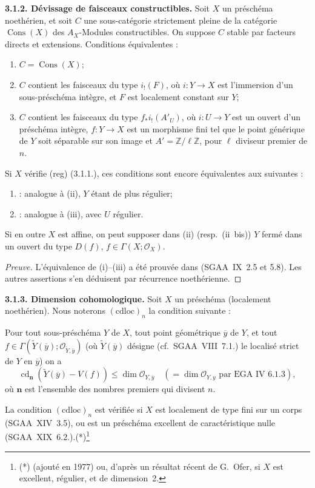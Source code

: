 \documentclass[11pt]{article}
\providecommand{\cO}{\mathcal{O}}
\providecommand{\wt}[1]{\widetilde{#1}}
\providecommand{\Cons}{\operatorname{Cons}}
\DeclareMathOperator{\cd}{cd}
\newcommand{\Z}{\mathbb{Z}}
\newcommand{\ol}[1]{\overline{#1}}
\providecommand{\Z}{\mathbb Z}
\begin{document}
\textbf{3.1.2. Dévissage de faisceaux constructibles.} Soit $X$ un préschéma noethérien, et soit $C$ une sous-catégorie strictement pleine de la catégorie $\Cons(X)$ des $A_X$-Modules constructibles. On suppose $C$ stable par facteurs directs et extensions. Conditions équivalentes :
\begin{enumerate}
\item[(i)] $C = \Cons(X)$;
\item[(ii)] $C$ contient les faisceaux du type $i_{!}(F)$, où $i : Y \to X$ est l'immersion d'un sous-préschéma intègre, et $F$ est localement constant sur $Y$;
\item[(iii)] $C$ contient les faisceaux du type $f_{*}i_{!}(A'_U)$, où $i : U \to Y$ est un ouvert d'un préschéma intègre, $f : Y \to X$ est un morphisme fini tel que le point générique de $Y$ soit séparable sur son image et $A' = \Z/\ell\Z$, pour $\ell$ diviseur premier de $n$.
\end{enumerate}
Si $X$ vérifie (reg) (3.1.1.), ces conditions sont encore équivalentes aux suivantes :
\begin{enumerate}
\item[(ii~bis)] : analogue à (ii), $Y$ étant de plus régulier;
\item[(iii~bis)] : analogue à (iii), avec $U$ régulier.
\end{enumerate}
Si en outre $X$ est affine, on peut supposer dans (ii) (resp.~(ii~bis)) $Y$ fermé dans un ouvert du type $D(f)$, $f \in \Gamma(X; \cO_X)$.

\begin{proof}[Preuve]
L'équivalence de (i)--(iii) a été prouvée dans (SGAA~IX~2.5 et 5.8). Les autres assertions s'en déduisent par récurrence noethérienne.
\end{proof}

\textbf{3.1.3. Dimension cohomologique.} Soit $X$ un préschéma (localement noethérien). Nous noterons $(\mathrm{cdloc})_n$ la condition suivante :

Pour tout sous-préschéma $Y$ de $X$, tout point géométrique $\ol{y}$ de $Y$, et tout $f \in \Gamma(\wt{Y}(\ol{y}); \cO_{\wt{Y},\ol{y}})$ (où $\wt{Y}(\ol{y})$ désigne (cf.~SGAA~VIII~7.1.) le localisé strict de $Y$ en $\ol{y}$) on a
\[
\cd_{\mathbf{n}}(\wt{Y}(\ol{y}) - V(f)) \leqslant \dim \cO_{Y,\ol{y}} \quad (= \dim \cO_{Y,y} \text{ par EGA~IV~6.1.3}),
\]
où $\mathbf{n}$ est l'ensemble des nombres premiers qui divisent $n$.

La condition $(\mathrm{cdloc})_n$ est vérifiée si $X$ est localement de type fini sur un corps (SGAA~XIV~3.5), ou est un préschéma excellent de caractéristique nulle (SGAA~XIX~6.2.).(*)\footnote{(*) (ajouté en 1977) ou, d'après un résultat récent de G.~Ofer, si $X$ est excellent, régulier, et de dimension~2.}
\end{document}
